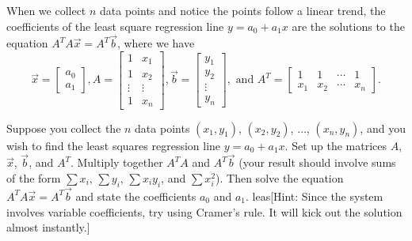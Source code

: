 \begin{theorem}
When we collect $n$ data points and notice the points follow a linear trend, the coefficients of the least square regression line $y=a_0+a_1x$ are the solutions to the equation $A^T A\vec x = A^T\vec b$, where we have $$
\vec x =
\begin{bmatrix}
a_0\\
a_1
\end{bmatrix}
,
A = \begin{bmatrix}
1&x_1\\
1&x_2\\ 
\vdots&\vdots\\
1&x_n
\end{bmatrix}
,
\vec b =
\begin{bmatrix}
y_1\\
y_2\\ 
\vdots\\
y_n
\end{bmatrix}
,\text{ and }
A^T = \begin{bmatrix}
1&1&\cdots&1\\
x_1&x_2&\cdots &x_n
\end{bmatrix}
.$$
\end{theorem}

\begin{problem}\label{getting the least square regression coefficients using the transpose}
 Suppose you collect the $n$ data points $(x_1,y_1)$, $(x_2,y_2)$, $\ldots$, $(x_n,y_n)$, and you wish to find the least squares regression line $y=a_0+a_1x$. Set up the matrices $A$, $\vec x$, $\vec b$, and $A^T$. Multiply together $A^TA$ and $A^T\vec b$ (your result should involve sums of the form $\sum x_i$, $\sum y_i$, $\sum x_iy_i$, and $\sum x_i^2$). Then solve the equation $A^TA\vec x = A^T\vec b$ and state the coefficients $a_0$ and $a_1$. leas[Hint: Since the system involves variable coefficients, try using Cramer's rule. It will kick out the solution almost instantly.]
\end{problem}


